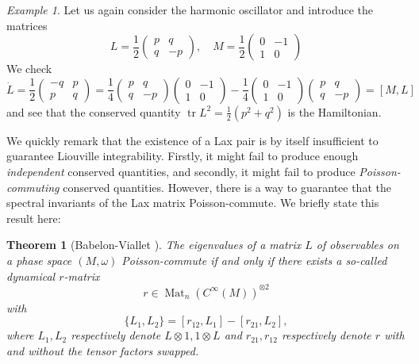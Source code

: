 \documentclass[11pt]{report}
\newtheorem{theorem}{Theorem}[section]
\theoremstyle{definition}
\theoremstyle{remark}
\theoremstyle{remark}
\newtheorem*{example}{Example}
\begin{document}
\begin{example}
Let us again consider the harmonic oscillator and introduce the matrices
\begin{equation*}
L = \frac{1}{2}
\begin{pmatrix}
p & q \\ q & -p
\end{pmatrix},
\quad
M = \frac{1}{2}
\begin{pmatrix}
0 & -1 \\
1 & 0
\end{pmatrix}
\end{equation*}
We check
\begin{equation*}
\dot L = \frac{1}{2}
\begin{pmatrix}
-q & p \\ p & q
\end{pmatrix}
=
\frac{1}{4}
\begin{pmatrix}
p & q \\ q & -p
\end{pmatrix}
\begin{pmatrix}
0 & -1 \\
1 & 0
\end{pmatrix}
-
\frac{1}{4}
\begin{pmatrix}
0 & -1 \\
1 & 0
\end{pmatrix}
\begin{pmatrix}
p & q \\ q & -p
\end{pmatrix}
= [M,L]
\end{equation*}
and see that the conserved quantity $\operatorname{tr} L^2 = \frac{1}{2}(p^2+q^2)$ is the Hamiltonian.
\end{example}

We quickly remark that the existence of a Lax pair is by itself insufficient to guarantee Liouville integrability. Firstly, it might fail to produce enough \emph{independent} conserved quantities, and secondly, it might fail to produce \emph{Poisson-commuting} conserved quantities. However, there is a way to guarantee that the spectral invariants of the Lax matrix Poisson-commute. We briefly state this result here:

\begin{theorem}[Babelon-Viallet \cite{book:arutyunov:elements}]
The eigenvalues of a matrix $L$ of observables on a phase space $(M,\omega)$ Poisson-commute if and only if there exists a so-called \emph{dynamical $r$-matrix}
\begin{equation*}
r \in \operatorname{Mat}_n(C^\infty(M))^{\otimes 2}
\end{equation*}
with
\begin{equation*}
\{ L_1, L_2 \} = [r_{12},L_1] - [r_{21},L_2],
\end{equation*}
where $L_1,L_2$ respectively denote $L \otimes 1, 1 \otimes L$ and $r_{21},r_{12}$ respectively denote $r$ with and without the tensor factors swapped.
\end{theorem}
\end{document}
